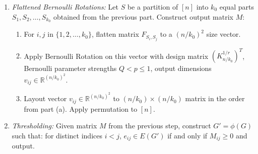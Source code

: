 \begin{mdframed}[innerrightmargin=15pt]
\begin{enumerate}
\begin{itemize}
\begin{itemize}
                    \vspace{-2mm}
                    $$F_{T_k, T_k}(i, j)=\begin{cases}
                    G_1{[\pi_k(T_k), \pi_k(T_k)]}_{ij}& i<j \\
                    G_2{[\pi_k(T_k), \pi_k(T_k)]}_{ij}& i>j \\
                    
                    \mathbf{1}\{i\in X_i\} & i=j
                    \end{cases}$$
                    
                    \vspace{-2mm}
                    $$F_{(i, j)\in S_k\times S_k\setminus T_k\times T_k}=\begin{cases} \sim \text{Bern}(Q) & i\neq j\\
                    \mathbf{1}\{i\in y_i\}           & i=j
                    \end{cases}.$$
                \end{itemize}
            \end{itemize}
            \item \textit{Flattened Bernoulli Rotations:} Let $S$ be a partition of $[n]$ into $k_0$ equal parts $S_1, S_2,\dots, S_{k_0}$ obtained from the previous part. Construct output matrix $M$:
            \begin{enumerate}
                \item For $i, j$ in $\{1,2,\dots,k_0\}$, flatten matrix $F_{S_i, S_j}$ to a $(n/k_0)^2$ size vector.
                \item Apply Bernoulli Rotation on this vector with design matrix $(K_{n/k_0}^{1/r})^T$, Bernoulli parameter strengths $Q<p\leq 1$, output dimensions $v_{ij}\in \mathbb{R}^{(n/k_0)^2}$.
                \item Layout vector $v_{ij}\in \mathbb{R}^{(n/k_0)^2}$ to $(n/k_0)\times (n/k_0)$ matrix in the order from part (a). Apply permutation to $[n]$.
               
            \end{enumerate}
            \item \textit{Thresholding:} Given matrix $M$ from the previous step, construct $G'=\phi(G)$ such that: for distinct indices $i<j$, $e_{ij}\in E(G')$ if and only if $M_{ij}\geq 0$ and output.
        \end{enumerate}
        \end{mdframed}